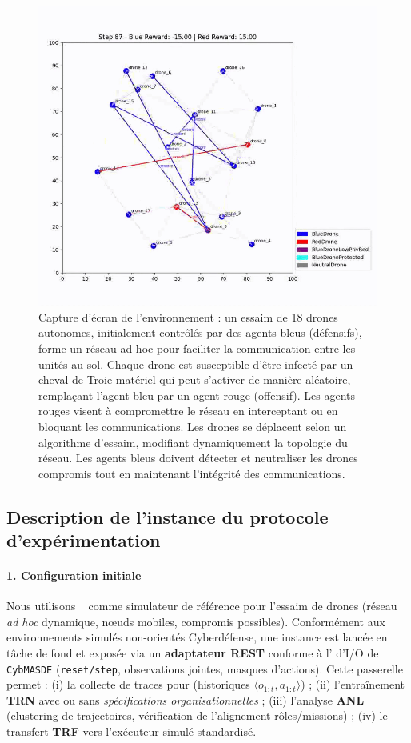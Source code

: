 \begin{figure}[h!]
  \centering
  \includegraphics[trim=0cm 1cm 0cm 1cm, clip, width=0.6\linewidth]{figures/cyborg.png}
  \caption[Capture d'écran de l'environnement ]{Capture d'écran de l'environnement  : un essaim de 18 drones autonomes, initialement contrôlés par des agents bleus (défensifs), forme un réseau ad hoc pour faciliter la communication entre les unités au sol. Chaque drone est susceptible d'être infecté par un cheval de Troie matériel qui peut s'activer de manière aléatoire, remplaçant l'agent bleu par un agent rouge (offensif). Les agents rouges visent à compromettre le réseau en interceptant ou en bloquant les communications. Les drones se déplacent selon un algorithme d'essaim, modifiant dynamiquement la topologie du réseau. Les agents bleus doivent détecter et neutraliser les drones compromis tout en maintenant l'intégrité des communications.}
  \label{fig:cyborg}
\end{figure}

\subsection{Description de l'instance du protocole d'expérimentation}

\paragraph{1. Configuration initiale}

Nous utilisons \textbf{}~\cite{Standen2021} comme simulateur de référence pour l'essaim de drones (réseau \textit{ad hoc} dynamique, nœuds mobiles, compromis possibles). Conformément aux environnements simulés non-orientés Cyberdéfense, une instance  est lancée en tâche de fond et exposée via un \textbf{adaptateur REST} conforme à l' d'I/O de \texttt{CybMASDE} (\texttt{reset/step}, observations jointes, masques d'actions). Cette passerelle permet : (i) la collecte de traces pour \texttt{} (historiques $\langle o_{1:t}, a_{1:t} \rangle$) ; (ii) l'entraînement  \textbf{TRN} avec ou sans \textit{spécifications organisationnelles} ; (iii) l'analyse \textbf{ANL} (clustering de trajectoires, vérification de l'alignement rôles/missions) ; (iv) le transfert \textbf{TRF} vers l'exécuteur simulé standardisé.

